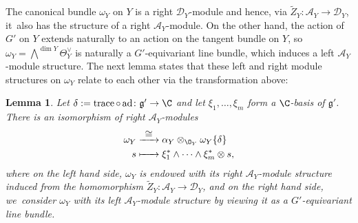 \documentclass[JEP,XML,SOM,Unicode,published]{cedram}
\newcommand{\To}[1]{\mathchoice{\xrightarrow{\textstyle\kern4pt#1\kern3pt}}{\xrightarrow{\,#1\,}}{}{}}
\newcommand\Mto[1]{\mathrel{\mapstochar\To{#1}}}
\newtheorem{lem}[thm]{Lemma}
\newcommand{\cA}{\mathscr{A}}
\newcommand{\frg}{\mathfrak{g}}
\DeclareMathOperator{\ad}{ad}
\DeclareMathOperator{\trace}{trace}
\begin{document}
The canonical bundle $\omega_Y$ on $Y$ is a right $\mathscr{D}_Y$\nobreakdash-mod\-ule and hence, via $\tilde Z_Y \colon \cA_Y \to \mathscr D_Y$, it~also has the structure of a right $\cA_Y$\nobreakdash-mod\-ule. On the other hand, the action of $G'$ on $Y$ extends naturally to an action on the tangent bundle on $Y$, so~$\omega_Y = \bigwedge^{\dim Y} \Theta_Y^\vee$ is naturally a $G'$-equivariant line bundle, which induces a left $\cA_Y$\nobreakdash-mod\-ule structure. The next lemma states that these left and right module structures on $\omega_Y$ relate to each other via the transformation above:

\begin{lem} \label{lem:rightAModuleStructuresOnOmega}
Let $\delta := \trace \circ \ad \colon \frg' \to \C$ and let $\xi_1,\dots,\xi_m$ form a $\C$-basis of $\frg'$. There is an isomorphism of right $\cA_Y$\nobreakdash-mod\-ules
\begin{align*}
\omega_Y &\To{\cong} \alpha_Y \otimes_{\O_Y} \omega_Y\{\delta\} \\
s &\Mto{\hphantom{\cong}} \xi_1^* \wedge \dots \wedge \xi_m^* \otimes s,
\end{align*}
where on the left hand side, $\omega_Y$ is endowed with its right $\cA_Y$\nobreakdash-mod\-ule structure induced from the homomorphism $\tilde Z_Y \colon \cA_Y \to \mathscr D_Y$, and on the right hand side, we~consider $\omega_Y$ with its left $\cA_Y$\nobreakdash-mod\-ule structure by viewing it as a $G'$-equivariant line bundle.
\end{lem}
\end{document}
